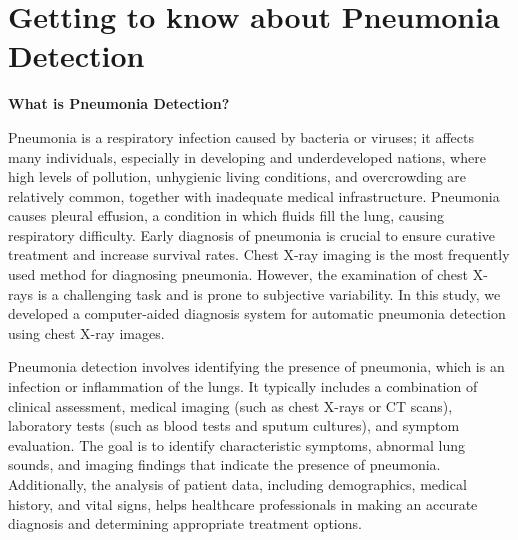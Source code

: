 %
%
\chapter{Getting to know about Pneumonia Detection }

\textbf{What is Pneumonia Detection?}


Pneumonia is a respiratory infection caused by bacteria or viruses; it affects many individuals, especially in developing and underdeveloped nations, where high levels of pollution, unhygienic living conditions, and overcrowding are relatively common, together with inadequate medical infrastructure. Pneumonia causes pleural effusion, a condition in which fluids fill the lung, causing respiratory difficulty. Early diagnosis of pneumonia is crucial to ensure curative treatment and increase survival rates. Chest X-ray imaging is the most frequently used method for diagnosing pneumonia. However, the examination of chest X-rays is a challenging task and is prone to subjective variability. In this study, we developed a computer-aided diagnosis system for automatic pneumonia detection using chest X-ray images.


Pneumonia detection involves identifying the presence of pneumonia, which is an infection or inflammation of the lungs. It typically includes a combination of clinical assessment, medical imaging (such as chest X-rays or CT scans), laboratory tests (such as blood tests and sputum cultures), and symptom evaluation. The goal is to identify characteristic symptoms, abnormal lung sounds, and imaging findings that indicate the presence of pneumonia. Additionally, the analysis of patient data, including demographics, medical history, and vital signs, helps healthcare professionals in making an accurate diagnosis and determining appropriate treatment options.


